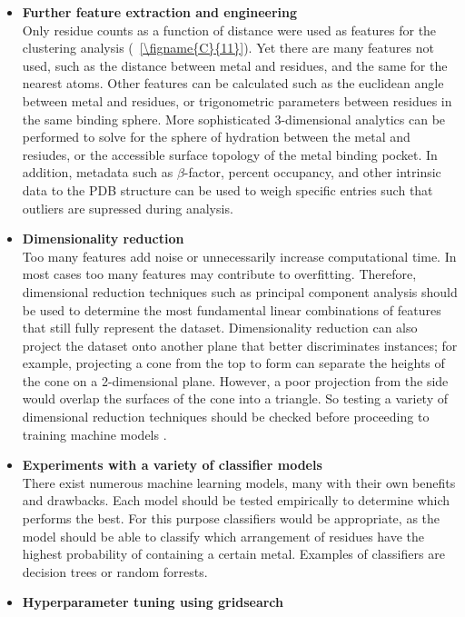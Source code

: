 \documentclass[../main/main]{subfiles}
\begin{document}
\begin{itemize}
	\item \textbf{Further feature extraction and engineering} \\
	Only residue counts as a function of distance were used as features for the clustering analysis (\FIGURE~\ref{\figname{C}{11}}). Yet there are many features not used, such as the distance between metal and residues, and the same for the nearest atoms. Other features can be calculated such as the euclidean angle between metal and residues, or trigonometric parameters between residues in the same binding sphere. More sophisticated 3-dimensional analytics can be performed to solve for the sphere of hydration between the metal and resiudes, or the accessible surface topology of the metal binding pocket. In addition, metadata such as $\beta$-factor, percent occupancy, and other intrinsic data to the PDB structure can be used to weigh specific entries such that outliers are supressed during analysis.
	\item \textbf{Dimensionality reduction} \\
	Too many features add noise or unnecessarily increase computational time. In most cases too many features may contribute to overfitting. Therefore, dimensional reduction techniques such as principal component analysis should be used to determine the most fundamental linear combinations of features that still fully represent the dataset. Dimensionality reduction can also project the dataset onto another plane that better discriminates instances; for example, projecting a cone from the top to form can separate the heights of the cone on a 2-dimensional plane. However, a poor projection from the side would overlap the surfaces of the cone into a triangle. So testing a variety of dimensional reduction techniques should be checked before proceeding to training machine models .
	\item \textbf{Experiments with a variety of classifier models} \\
	There exist numerous machine learning models, many with their own benefits and drawbacks. Each model should be tested empirically to determine which performs the best. For this purpose classifiers would be appropriate, as the model should be able to classify which arrangement of residues have the highest probability of containing a certain metal. Examples of classifiers are decision trees or random forrests.
	\item \textbf{Hyperparameter tuning using gridsearch} \\

\end{itemize}
\end{document}
